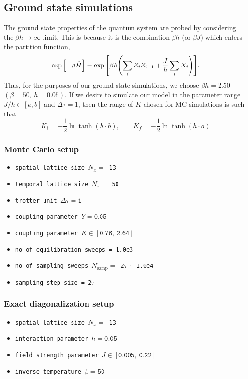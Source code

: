 \documentclass[../thesis_main.tex]{subfiles}
\begin{document}
\subsection{Ground state simulations}
The ground state properties of the quantum system are probed by considering the $\beta h \to \infty$ limit. This is because it is the combination $\beta h$ (or $\beta J$) which enters the partition function,
\begin{equation}
    \exp\qty[-\beta \hat{H}] = \exp\qty[\beta h \qty(\sum_i Z_i Z_{i+1} + \frac{J}{h} \sum_i X_i)].
\end{equation}
Thus, for the purposes of our ground state simulations, we choose $\beta h= 2.50$ $(\beta = 50, \: h = 0.05)$. If we desire to simulate our model in the parameter range $J/h \in [a, b]$ and $\Delta \tau = 1$, then the range of $K$ chosen for MC simulations is such that
\begin{equation}
    K_i =-\frac{1}{2} \ln \tanh(h\cdot b), \qquad K_f =-\frac{1}{2} \ln \tanh(h\cdot a) 
\end{equation}   

\subsubsection{Monte Carlo setup}
\begin{itemize}[label={}]
    \setlength{\itemsep}{0.1em}
    \item \texttt{spatial lattice size $N_x = $ 13}
    \item \texttt{temporal lattice size $N_\tau = $ 50}
    \item \texttt{trotter unit $\Delta \tau = \texttt{1} $}
    \item \texttt{coupling parameter $Y = \texttt{0.05}$}
    \item \texttt{coupling parameter $K \in [\texttt{0.76}, \: \texttt{2.64}]$}
    \item \texttt{no of equilibration sweeps = \texttt{1.0e3}}
    \item \texttt{no of sampling sweeps $N_\text{samp} = $ 2$\tau \: \cdot$ 1.0e4}
    \item \texttt{sampling step size = 2$\tau $ }
\end{itemize}

\subsubsection{Exact diagonalization setup}
\begin{itemize}[label={}]
    \setlength{\itemsep}{0.1em}
    \item \texttt{spatial lattice size $N_x = $ 13}
    \item \texttt{interaction parameter $h = \texttt{0.05}$} 
    \item \texttt{field strength parameter $J \in [\texttt{0.005}, \:\texttt{0.22}]$} 
    \item \texttt{inverse temperature $\beta = \texttt{50}$}
\end{itemize}
\end{document}
